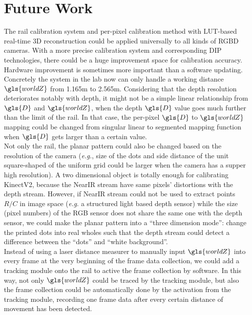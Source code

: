 \section{Future Work}
%
The rail calibration system and per-pixel calibration method with \gls{LUT}-based real-time \gls{3D} reconstruction could be applied universally to all kinds of \gls{RGBD} cameras. With a more precise calibration system and corresponding \gls{DIP} technologies, there could be a huge improvement space for calibration accuracy. Hardware improvement is sometimes more important than a software updating. Concretely the system in the lab now can only handle a working distance \(\gls{worldZ}\) from 1.165m to 2.565m. Considering that the depth resolution deteriorates notably with depth, it might not be a simple linear relationship from \(\gls{D}\) and \(\gls{worldZ}\), when the depth \(\gls{D}\) value goes much further than the limit of the rail. In that case, the per-pixel \(\gls{D}\) to \(\gls{worldZ}\) mapping could be changed from singular linear to segmented mapping function when \(\gls{D}\) gets larger than a certain value.
\\\indent
Not only the rail, the planar pattern could also be changed based on the resolution of the camera (\textit{e.g.}, size of the dots and side distance of the unit square-shaped of the uniform grid could be larger when the camera has a supper high resolution). A two dimensional object is totally enough for calibrating \gls{KinectV2}, because the \gls{NearIR} stream have same pixels' distortions with the depth stream. However, if \gls{NearIR} stream could not be used to extract points \(R/C\) in image space (\textit{e.g.} a structured light based depth sensor) while the size (pixel numbers) of the RGB sensor does not share the same one with the depth sensor, we could make the planar pattern into a \enquote{three dimension mode}: change the printed dots into real wholes such that the depth stream could detect a difference between the \enquote{dots} and \enquote{white background}. 
\\\indent
Instead of using a laser distance measurer to manually input \(\gls{worldZ}\) into every frame at the very beginning of the frame data collection, we could add a tracking module onto the rail to active the frame collection by software. In this way, not only \(\gls{worldZ}\) could be traced by the tracking module, but also the frame collection could be automatically done by the activation from the tracking module, recording one frame data after every certain distance of movement has been detected. 
